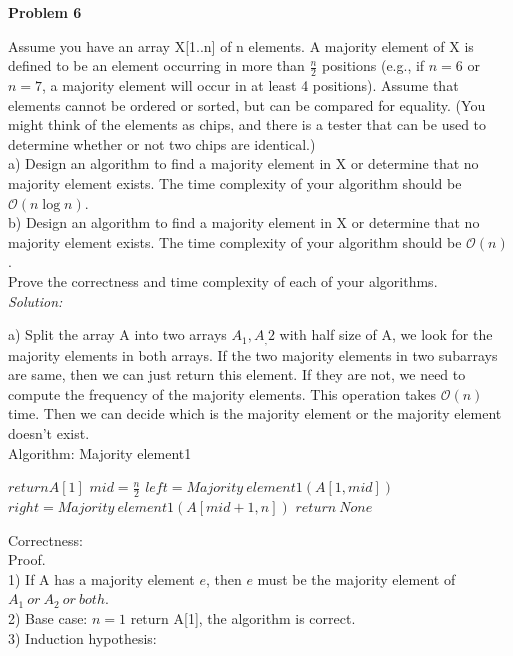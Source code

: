 \documentclass[12pt,letterpaper]{article}
\def\pp{\par\noindent}
\newcommand{\problem}[1]{ \bigskip \pp \textbf{Problem #1}\par}
\newcommand{\solution}{\textit{Solution:}\par}
\begin{document}
\problem{6}
Assume you have an array X[1..n] of n elements. A majority element of X is defined to be an element occurring in more than $\frac{n}{2}$ positions (e.g., if $ n = 6 $ or $ n = 7$, a majority element will occur in at least 4 positions). Assume that elements cannot be ordered or sorted, but can be compared for equality. (You might think of the elements as chips, and there is a tester that can be used to determine whether or not two chips are identical.) \\
a) Design an algorithm to find a majority element in X or determine that no majority element exists. The time complexity of your algorithm should be $\mathcal{O}(n \log n)$. \\
b) Design an algorithm to find a majority element in X or determine that no majority element exists. The time complexity of your algorithm should be $\mathcal{O}(n)$. \\
Prove the correctness and time complexity of each of your algorithms. \\
\solution
a) Split the array A into two arrays $A_1,A_,2$ with half size of A, we look for the majority elements in both arrays. If the two majority elements in two subarrays are same, then we can just return this element. If they are not, we need to compute the frequency of the majority elements. This operation takes $\mathcal{O}(n)$ time. Then we can decide which is the majority element or the majority element doesn't exist. \\
Algorithm: Majority element1 \\
\begin{algorithm}[H]
 {
	$return A[1]$ \;
}
$ mid = \frac{n}{2}$\;
$ left = Majority\  element1(A[1,mid])$\;
$ right = Majority\  element1(A[mid+1,n])$\;
   $return\  None$ \;
\end{algorithm}
Correctness: \\
Proof. \\
1) If A has a majority element $e$, then $e$ must be the majority element of $A_1\ or\ A_2\ or\ both$. \\
2) Base case: $n=1$ return A[1], the algorithm is correct. \\
3) Induction hypothesis: \\
\end{document}
